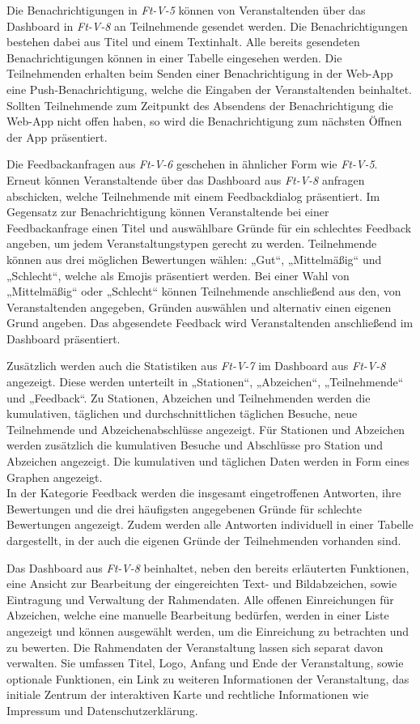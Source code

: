 Die Benachrichtigungen in \textit{Ft-V-5} können von Veranstaltenden über das
Dashboard in \textit{Ft-V-8} an Teilnehmende gesendet werden. Die
Benachrichtigungen bestehen dabei aus Titel und einem Textinhalt. Alle bereits
gesendeten Benachrichtigungen können in einer Tabelle eingesehen werden. Die
Teilnehmenden erhalten beim Senden einer Benachrichtigung in der Web-App eine
Push-Benachrichtigung, welche die Eingaben der Veranstaltenden beinhaltet.
Sollten Teilnehmende zum Zeitpunkt des Absendens der Benachrichtigung die
Web-App nicht offen haben, so wird die Benachrichtigung zum nächsten Öffnen der
App präsentiert.

Die Feedbackanfragen aus \textit{Ft-V-6} geschehen in ähnlicher Form wie
\textit{Ft-V-5}. Erneut können Veranstaltende über das Dashboard aus
\textit{Ft-V-8} anfragen abschicken, welche Teilnehmende mit einem
Feedbackdialog präsentiert. Im Gegensatz zur Benachrichtigung können
Veranstaltende bei einer Feedbackanfrage einen Titel und auswählbare Gründe für
ein schlechtes Feedback angeben, um jedem Veranstaltungstypen gerecht zu werden.
Teilnehmende können aus drei möglichen Bewertungen wählen: „Gut“, „Mittelmäßig“
und „Schlecht“, welche als Emojis präsentiert werden. Bei einer Wahl von
„Mittelmäßig“ oder „Schlecht“ können Teilnehmende anschließend aus den, von
Veranstaltenden angegeben, Gründen auswählen und alternativ einen eigenen Grund
angeben. Das abgesendete Feedback wird Veranstaltenden anschließend im Dashboard
präsentiert.

Zusätzlich werden auch die Statistiken aus \textit{Ft-V-7} im
Dashboard aus \textit{Ft-V-8} angezeigt. Diese werden unterteilt in „Stationen“,
„Abzeichen“, „Teilnehmende“ und „Feedback“. Zu Stationen, Abzeichen und
Teilnehmenden werden die kumulativen, täglichen und durchschnittlichen täglichen
Besuche, neue Teilnehmende und Abzeichenabschlüsse angezeigt. Für Stationen und
Abzeichen werden zusätzlich die kumulativen Besuche und Abschlüsse pro Station
und Abzeichen angezeigt. Die kumulativen und täglichen Daten werden in Form
eines Graphen angezeigt. \\
In der Kategorie Feedback werden die insgesamt eingetroffenen Antworten, ihre
Bewertungen und die drei häufigsten angegebenen Gründe für schlechte Bewertungen
angezeigt. Zudem werden alle Antworten individuell in einer Tabelle dargestellt,
in der auch die eigenen Gründe der Teilnehmenden vorhanden sind.

Das Dashboard aus \textit{Ft-V-8} beinhaltet, neben den bereits erläuterten
Funktionen, eine Ansicht zur Bearbeitung der eingereichten Text- und
Bildabzeichen, sowie Eintragung und Verwaltung der Rahmendaten. Alle offenen
Einreichungen für Abzeichen, welche eine manuelle Bearbeitung bedürfen, werden
in einer Liste angezeigt und können ausgewählt werden, um die Einreichung zu
betrachten und zu bewerten. Die Rahmendaten der Veranstaltung lassen sich
separat davon verwalten. Sie umfassen Titel, Logo, Anfang und Ende der
Veranstaltung, sowie optionale Funktionen, ein Link zu weiteren Informationen
der Veranstaltung, das initiale Zentrum der interaktiven Karte und rechtliche
Informationen wie Impressum und Datenschutzerklärung.

